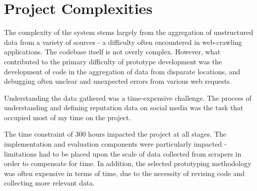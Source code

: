 


\section{Project Complexities}

The complexity of the system stems largely from the aggregation of unstructured data from a variety of sources - a difficulty often encountered in web-crawling applications. The codebase itself is not overly complex. However, what contributed to the primary difficulty of prototype development was the development of code in the aggregation of data from disparate locations, and debugging often unclear and unexpected errors from various web requests.

Understanding the data gathered was a time-expensive challenge. The process of understanding and defining reputation data on social media was the task that occupied most of my time on the project. 

The time constraint of 300 hours impacted the project at all stages. The implementation and evaluation components were particularly impacted - limitations had to be placed upon the scale of data collected from scrapers in order to compensate for time. In addition, the selected prototyping methodology was often expensive in terms of time, due to the necessity of revising code and collecting more relevant data.




